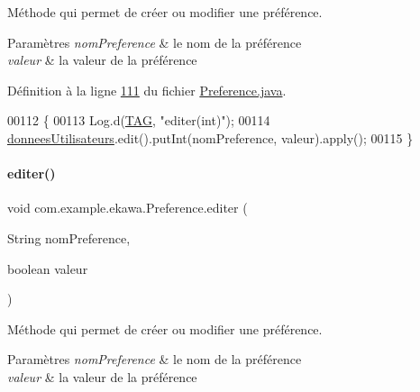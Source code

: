 Méthode qui permet de créer ou modifier une préférence. 


\begin{DoxyParams}{Paramètres}
{\em nom\+Preference} & le nom de la préférence \\
\hline
{\em valeur} & la valeur de la préférence \\
\hline
\end{DoxyParams}


Définition à la ligne \hyperlink{_preference_8java_source_l00111}{111} du fichier \hyperlink{_preference_8java_source}{Preference.\+java}.


\begin{DoxyCode}
00112     \{
00113         Log.d(\hyperlink{classcom_1_1example_1_1ekawa_1_1_preference_aeb5e1e787153c37929839622ac5d0339}{TAG}, \textcolor{stringliteral}{"editer(int)"});
00114         \hyperlink{classcom_1_1example_1_1ekawa_1_1_preference_a5ac49439bd1c8c3ff12dd9eb2475b894}{donneesUtilisateurs}.edit().putInt(nomPreference, valeur).apply();
00115     \}
\end{DoxyCode}
\mbox{\label{classcom_1_1example_1_1ekawa_1_1_preference_a701dc293c4474f59028733e94b49b9da}} 
\paragraph{\texorpdfstring{editer()}{editer()}\hspace{0.1cm}{\footnotesize\ttfamily [3/3]}}
{\footnotesize\ttfamily void com.\+example.\+ekawa.\+Preference.\+editer (\begin{DoxyParamCaption}\item[{String}]{nom\+Preference,  }\item[{boolean}]{valeur }\end{DoxyParamCaption})}



Méthode qui permet de créer ou modifier une préférence. 


\begin{DoxyParams}{Paramètres}
{\em nom\+Preference} & le nom de la préférence \\
\hline
{\em valeur} & la valeur de la préférence \\
\hline
\end{DoxyParams}


